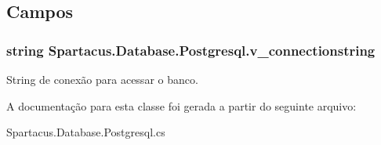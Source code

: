 \subsection{Campos}
\hypertarget{classSpartacus_1_1Database_1_1Postgresql_a59cdb5e07bd009279982ef91dc98724f}{
\subsubsection[{v\+\_\+connectionstring}]{\setlength{\rightskip}{0pt plus 5cm}string Spartacus.\+Database.\+Postgresql.\+v\+\_\+connectionstring}}\label{classSpartacus_1_1Database_1_1Postgresql_a59cdb5e07bd009279982ef91dc98724f}


String de conexão para acessar o banco. 



A documentação para esta classe foi gerada a partir do seguinte arquivo\+:\begin{DoxyCompactItemize}
\item 
Spartacus.\+Database.\+Postgresql.\+cs\end{DoxyCompactItemize}

